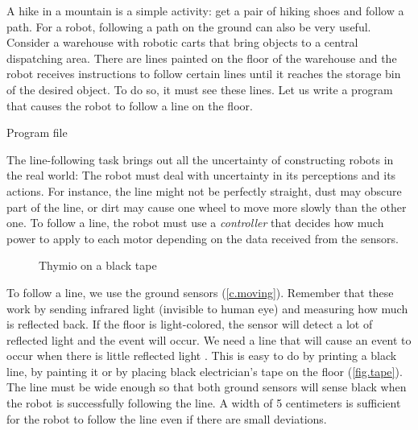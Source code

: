 
\label{ch.line}

A hike in a mountain is a simple activity:
get a pair of hiking shoes and follow a path.
For a robot, following a path on the ground can also be very useful.
Consider a warehouse with robotic carts that bring objects to a central dispatching area.
There are lines painted on the floor of the warehouse and the robot receives instructions to follow
certain lines until it reaches the storage bin of the desired object.
To do so, it must see these lines.
Let us write a program that causes the robot to follow a line on the floor.

{\raggedleft \hfill Program file }

The line-following task brings out all the uncertainty of constructing
robots in the real world: The robot must deal with uncertainty in its perceptions
and its actions.
For instance, the line might not be perfectly straight, dust may obscure part of the line, or dirt may cause one wheel to move more slowly than the other one.
To follow a line, the robot must use a
\emph{controller} that decides how much power to apply to each motor
depending on the data received from the sensors.


\begin{figure}
	\hfill
	\caption{Thymio on a black tape}
\end{figure}

To follow a line, we use the ground sensors (\cref{c.moving}).
Remember that these work by sending infrared light (invisible to human eye) and measuring how much is reflected back.
If the floor is light-colored, the sensor will detect a lot of reflected
light and the event  will occur. We need a line
that will cause an event to occur when there is little reflected light
. This is easy to do by printing a black line, by painting it or by placing black
electrician's tape on the floor (\cref{fig.tape}). The line must
be wide enough so that both ground sensors will sense black when the
robot is successfully following the line. A width of 5
centimeters is sufficient for the robot to follow the line even if there
are small deviations.

